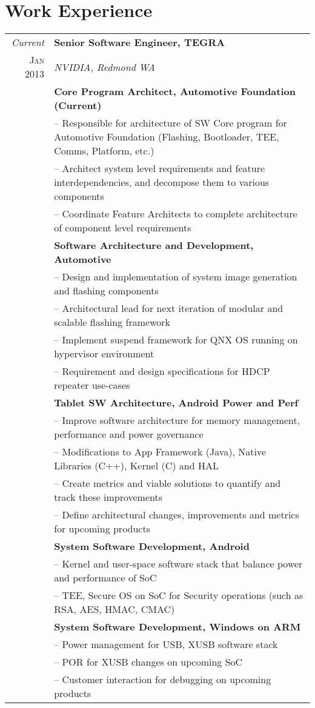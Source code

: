 \documentclass[letter,10pt]{article}
\begin{document}
\section{Work Experience}
\begin{tabular}{r|p{16cm}}

\emph{Current} & \textbf{Senior Software Engineer, TEGRA}\\
\textsc{Jan 2013}&\emph{NVIDIA, Redmond WA}\\
&\footnotesize{\textbf{Core Program Architect, Automotive Foundation (Current)
}}\\
&\footnotesize{
-- Responsible for architecture of SW Core program for Automotive Foundation (Flashing, Bootloader, TEE, Comms, Platform, etc.)
}\\
&\footnotesize{
-- Architect system level requirements and feature interdependencies, and decompose them to various components
}\\
&\footnotesize{
-- Coordinate Feature Architects to complete architecture of component level requirements
}\\
&\footnotesize{\textbf{Software Architecture and Development, Automotive
}}\\
&\footnotesize{
-- Design and implementation of system image generation and flashing components
}\\
&\footnotesize{
-- Architectural lead for next iteration of modular and scalable flashing framework
}\\
&\footnotesize{
-- Implement suspend framework for QNX OS running on hypervisor environment
}\\
&\footnotesize{
-- Requirement and design specifications for HDCP repeater use-cases
}\\
&\footnotesize{\textbf{Tablet SW Architecture, Android Power and Perf
}}\\
&\footnotesize{
 -- Improve software architecture for memory management, performance and power governance
}\\
&\footnotesize{
 -- Modifications to App Framework (Java), Native Libraries (C++), Kernel (C) and HAL 
}\\
&\footnotesize{
 -- Create metrics and viable solutions to quantify and track these improvements
}\\
&\footnotesize{
-- Define architectural changes, improvements and metrics for upcoming products
}\\
&\footnotesize{\textbf{System Software Development, Android
}}\\
&\footnotesize{
 -- Kernel and user-space software stack that balance power and performance of SoC
}\\
&\footnotesize{
 -- TEE, Secure OS on SoC for Security operations (such as RSA, AES, HMAC, CMAC) 
}\\
&\footnotesize{\textbf{System Software Development, Windows on ARM
}}\\
&\footnotesize{
 -- Power management for USB, XUSB software stack
}\\
&\footnotesize{
 -- POR for XUSB changes on upcoming SoC 
}\\
&\footnotesize{
 -- Customer interaction for debugging on upcoming products 
}\\


\end{tabular}
\end{document}
